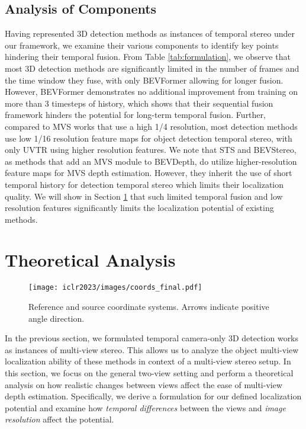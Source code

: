 \documentclass[runningheads, hyperfootnotes=false]{article}
\begin{document}
\subsection{Analysis of Components}
Having represented 3D detection methods as instances of temporal stereo under our framework, we examine their various components to identify key points hindering their temporal fusion. From Table \ref{tab:formulation}, we observe that most 3D detection methods are significantly limited in the number of frames and the time window they fuse, with only BEVFormer allowing for longer fusion. However, BEVFormer demonstrates no additional improvement from training on more than 3 timesteps of history, which shows that their sequential fusion framework hinders the potential for long-term temporal fusion. Further, compared to MVS works that use a high 1/4 resolution, most detection methods use low 1/16 resolution feature maps for object detection temporal stereo, with only UVTR using higher resolution features. We note that STS and BEVStereo, as methods that add an MVS module to BEVDepth, do utilize higher-resolution feature maps for MVS depth estimation. However, they inherit the use of short temporal history for detection temporal stereo which limits their localization quality. We will show in Section \ref{sec:theory} that such limited temporal fusion and low resolution features significantly limits the localization potential of existing methods.  \section{Theoretical Analysis}\label{sec:theory}
\begin{wrapfigure}[]{r}{0.5\textwidth}
  \centering
  \texttt{[image: iclr2023/images/coords\_final.pdf]}
  \captionsetup{aboveskip=0pt}\captionsetup{belowskip=0pt}\caption{Reference and source coordinate systems. Arrows indicate positive angle direction.}
  \label{fig:coords}
\end{wrapfigure}
 In the previous section, we formulated temporal camera-only 3D detection works as instances of multi-view stereo. This allows us to analyze the object multi-view localization ability of these methods in context of a multi-view stereo setup. In this section, we focus on the general two-view setting and perform a theoretical analysis on how realistic changes between views affect the ease of multi-view depth estimation. Specifically, we derive a formulation for our defined localization potential and examine how \textit{temporal differences} between the views and \textit{image resolution} affect the potential. 
\end{document}
